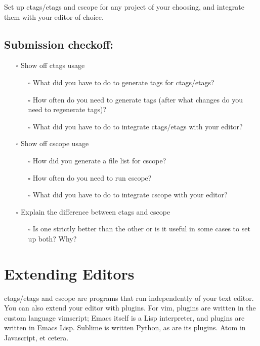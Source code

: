 \documentclass{article}
\begin{document}
Set up ctags/etags and cscope for any project of your choosing, and integrate
them with your editor of choice.

\subsection*{Submission checkoff:}
\begin{itemize}
  \item[$\square$] Show off ctags usage
    \begin{itemize}
      \item[$\square$] What did you have to do to generate tags for ctags/etags?
      \item[$\square$] How often do you need to generate tags (after what
        changes do you need to regenerate tags)?
      \item[$\square$] What did you have to do to integrate ctags/etags with
        your editor?
    \end{itemize}
  \item[$\square$] Show off cscope usage
    \begin{itemize}
      \item[$\square$] How did you generate a file list for cscope?
      \item[$\square$] How often do you need to run cscope?
      \item[$\square$] What did you have to do to integrate cscope with your
        editor?
    \end{itemize}
  \item[$\square$] Explain the difference between ctags and cscope
    \begin{itemize}
      \item[$\square$] Is one strictly better than the other or is it useful
        in some cases to set up both? Why?
    \end{itemize}
\end{itemize}



\newpage
\section{Extending Editors}

ctags/etags and cscope are programs that run independently of your text
editor. You can also extend your editor with plugins. For vim, plugins are
written in the custom language vimscript; Emacs itself is a Lisp interpreter,
and plugins are written in Emacs Lisp. Sublime is written Python, as are its
plugins. Atom in Javascript, et cetera.
\end{document}
